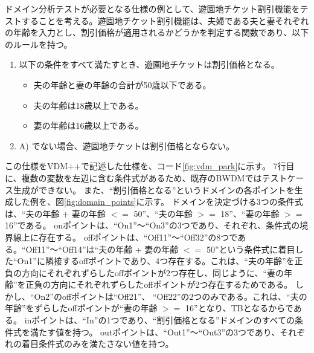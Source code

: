 \documentclass[uplatex, report, a4j, 10pt]{jsbook}
\begin{document}
ドメイン分析テストが必要となる仕様の例として、遊園地チケット割引機能をテストすることを考える。遊園地チケット割引機能は、夫婦である夫と妻それぞれの年齢を入力とし、割引価格が適用されるかどうかを判定する関数であり、以下のルールを持つ。
\begin{enumerate}
  \renewcommand{\labelenumi}{\Alph{enumi})}
  \item\label{enu:yuenchi} 以下の条件をすべて満たすとき、遊園地チケットは割引価格となる。
        \begin{itemize}
          \item 夫の年齢と妻の年齢の合計が50歳以下である。
          \item 夫の年齢は18歳以上である。
          \item 妻の年齢は16歳以上である。
        \end{itemize}
  \item A) でない場合、遊園地チケットは割引価格とならない。
\end{enumerate}
この仕様をVDM++で記述した仕様を、コード\ref{fig:vdm_park}に示す。
7行目に、複数の変数を左辺に含む条件式があるため、既存のBWDMではテストケース生成ができない。
また、“割引価格となる”というドメインの各ポイントを生成した例を、図\ref{fig:domain_points}に示す。
ドメインを決定づける3つの条件式は、“夫の年齢 + 妻の年齢 $<=$ 50”、“夫の年齢 $>=$ 18”、“妻の年齢 $>=$ 16”である。
onポイントは、“On1”〜“On3”の3つであり、それぞれ、条件式の境界線上に存在する。
offポイントは、“Off11”〜“Off32”の8つである。“Off11”〜“Off14”は“夫の年齢 + 妻の年齢 $<=$ 50”という条件式に着目した“On1”に隣接するoffポイントであり、4つ存在する。これは、“夫の年齢”を正負の方向にそれぞれずらしたoffポイントが2つ存在し、同じように、“妻の年齢”を正負の方向にそれぞれずらしたoffポイントが2つ存在するためである。
しかし、“On2”のoffポイントは“Off21”、 “Off22”の2つのみである。これは、“夫の年齢”をずらしたoffポイントが“妻の年齢 $>=$ 16”となり、TBとなるからである。
inポイントは、“In”の1つであり、“割引価格となる”ドメインのすべての条件式を満たす値を持つ。
outポイントは、“Out1”〜“Out3”の3つであり、それぞれの着目条件式のみを満たさない値を持つ。
\end{document}
